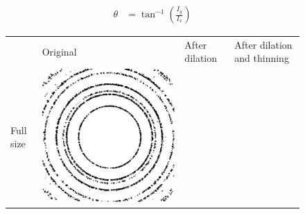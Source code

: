 \documentclass[preprint]{iucr}              %
\begin{document}

\begin{align} \label{eq:gradOrien}
\theta& =\tan^{-1}\left(\frac{I_y}{I_x}\right)
\end{align}

\begin{figure}
\centering

\begin{tabular}{>{\centering\arraybackslash}m{.1\linewidth}>{\centering\arraybackslash}m{.25\linewidth}>{\centering\arraybackslash}m{.25\linewidth}>{\centering\arraybackslash}m{.25\linewidth}}
& Original & After dilation & After dilation and thinning
\\
Full size&
\includegraphics[width=\linewidth]{Detail/NorSmoothFull.png}&

\end{tabular}
\end{figure}
\end{document}
